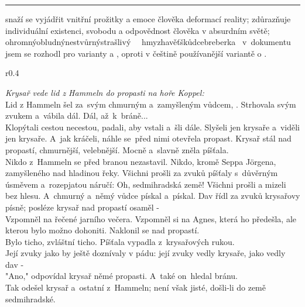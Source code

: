 \documentclass{extarticle} %
\begin{document}
\vfill

\noindent\begin{minipage}{\textwidth}
    {\textcolor{\wpagecolor}{\rule{\linewidth}{0.4pt}}
    \footnotesize
     snaží se vyjádřit vnitřní prožitky a emoce člověka deformací reality;
     zdůrazňuje individuální existenci, svobodu a odpovědnost člověka v absurdním světě;
     ohromný\wsl obludný\wsl nestvůrný\wsl strašlivý~
    \textbfhl{\leftrightarrow}{ }~hmyz\wsl havěť\wsl škůdce\wsl breberka
    \textbfhl{$\Rightarrow$}~v~dokumentu jsem se rozhodl pro varianty  a ,
    oproti v češtině používanější variantě o .
    }
\end{minipage}

\newpage


\changefontsize{8pt}


\noindent\begin{wrapfigure}{r}{0.4\textwidth}
\tiny

\setlength{\parindent}{3pt}
\textit{Krysař vede lid z Hammeln do propasti na hoře Koppel:}\\
Lid z Hammeln šel za~svým chmurným a~zamyšleným vůdcem, .
Strhovala svým zvukem a~vábila dál.
Dál, až~k~bráně...\\
Klopýtali cestou necestou, padali, aby vstali a~šli dále.
Slyšeli jen krysaře a~viděli jen krysaře.
A~jak kráčeli, náhle se~před nimi otevřela propast.
Krysař stál nad propastí, chmurnější, velebnější.
Mocně a~slavně zněla píšťala.\\
Nikdo z~Hammeln se před branou nezastavil.
Nikdo, kromě Seppa Jörgena, zamyšleného nad hladinou řeky.
Všichni prošli za zvuků píšťaly s~důvěrným úsměvem a~rozepjatou náručí:
Oh, sedmihradská země!
Všichni prošli a mizeli bez hlesu.
A~chmurný a~němý vůdce pískal a~pískal.
Dav řídl za zvuků krysařovy písně; posléze krysař nad propastí osaměl -\\
Vzpomněl na  řečené jarního večera.
Vzpomněl si na Agnes, která ho předešla, ale kterou bylo možno dohoniti.
Naklonil se nad propastí.\\
Bylo ticho, zvláštní ticho.
Píšťala vypadla z~krysařových rukou.
\\
Její zvuky jako by ještě doznívaly v pádu: její zvuky vedly krysaře, jako vedly dav -\\
"Ano," odpovídal krysař němé propasti.
A~také on~hledal bránu.\\
Tak odešel krysař a~ostatní z~Hammeln; není však jisté, došli-li do země sedmihradské.
\end{wrapfigure}
\end{document}
